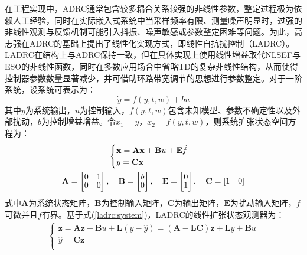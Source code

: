 在工程实现中，ADRC通常包含较多耦合关系较强的非线性参数，整定过程极为依赖人工经验，同时在实际嵌入式系统中当采样频率有限、测量噪声明显时，过强的非线性观测与反馈机制可能引入抖振、噪声敏感或参数整定困难等问题。为此，高志强在ADRC的基础上提出了线性化实现方式，即线性自抗扰控制（LADRC）。LADRC在结构上与ADRC保持一致，但在具体实现上使用线性增益取代NLSEF与ESO的非线性函数，同时在多数应用场合中省略TD的复杂非线性结构，从而使得控制器参数数量显著减少，并可借助环路带宽调节的思想进行参数整定。对于一阶系统，设系统可表示为：
\begin{equation}
	\dot{y}=f ( y , t , w )+b u \label{ladrc:system}
\end{equation}
其中$y$为系统输出，$u$为控制输入，$f(y,t,w)$包含未知模型、参数不确定性以及外部扰动，$b$为控制增益增益。令$x_1=y$，$x_2=f(y,t,w)$，则系统扩张状态空间方程为：
\begin{equation}
	\begin{gathered}
		\begin{cases} {\dot{\mathbf{x}}=\mathbf{A} \mathbf{x}+\mathbf{B} u+\mathbf{E} \dot{f}} \\ {y=\mathbf{C} \mathbf{x}} \\ \end{cases} \\
		\renewcommand{\arraystretch}{0.85}       %
		\mathbf{A}=\left[ \begin{matrix} {0} & {1} \\ {0} & {0} \\ \end{matrix} \right], \quad \mathbf{B}=\left[ \begin{matrix} {b} \\ {0} \\ \end{matrix} \right],\quad \mathbf{E}=\left[ \begin{matrix} {0} \\ {1} \\ \end{matrix} \right], \quad \mathbf{C}=\left[ \begin{matrix} {1} & {0} \\ \end{matrix} \right]
	\end{gathered}\label{ladrc:state}
\end{equation}
式中$\mathbf{A}$为系统状态矩阵，$\mathbf{B}$为控制输入矩阵，$\mathbf{C}$为输出矩阵，$\mathbf{E}$为扰动输入矩阵，$f$可微并且$\dot{f}$有界。基于式(\ref{ladrc:system})，LADRC的线性扩张状态观测器为：
\begin{equation}
	\begin{gathered}
		\begin{cases} {\dot{\mathbf{z}}=\mathbf{A} \mathbf{z}+\mathbf{B} u+\mathbf{L} ( y-\hat{y} )} = (\mathbf{A}-\mathbf{L}\mathbf{C}) \mathbf{z}+\mathbf{L} y+\mathbf{B} u \\
			{\hat{y}=\mathbf{C} \mathbf{z}}                                                                                                                         \\
		\end{cases}
	\end{gathered}\label{ladrc:eso}
\end{equation}
